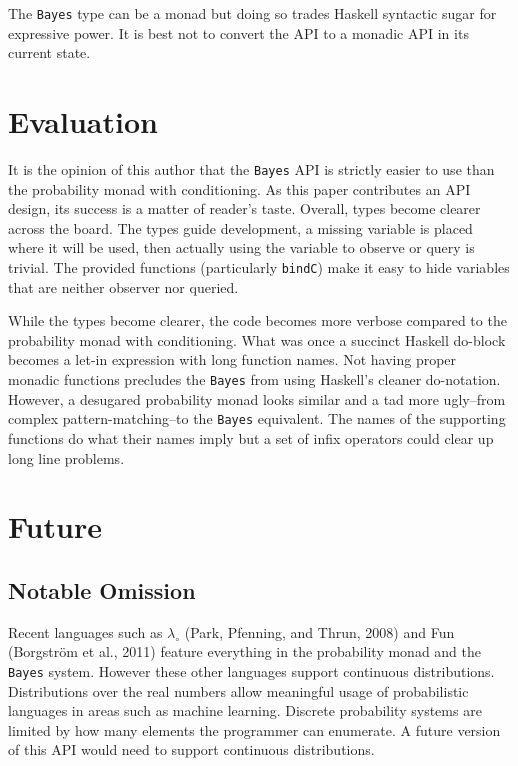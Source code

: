 \documentclass[10pt,twocolumn]{article}
\begin{document}
The \texttt{Bayes} type can be a monad but doing so trades Haskell syntactic sugar for expressive power. It is best not to convert the API to a monadic API in its current state.

\section{Evaluation}
It is the opinion of this author that the \texttt{Bayes} API is strictly easier to use than the probability monad with conditioning. As this paper contributes an API design, its success is a matter of reader's taste. Overall, types become clearer across the board. The types guide development, a missing variable is placed where it will be used, then actually using the variable to observe or query is trivial. The provided functions (particularly \texttt{bindC}) make it easy to hide variables that are neither observer nor queried.

While the types become clearer, the code becomes more verbose compared to the probability monad with conditioning. What was once a succinct Haskell do-block becomes a let-in expression with long function names. Not having proper monadic functions precludes the \texttt{Bayes} from using Haskell's cleaner do-notation. However, a desugared probability monad looks similar and a tad more ugly--from complex pattern-matching--to the \texttt{Bayes} equivalent. The names of the supporting functions do what their names imply but a set of infix operators could clear up long line problems.

\section{Future}
\subsection{Notable Omission}
Recent languages such as $\lambda_\circ$ (Park, Pfenning, and Thrun, 2008) and Fun (Borgström et al., 2011) feature everything in the probability monad and the \texttt{Bayes} system. However these other languages support continuous distributions. Distributions over the real numbers allow meaningful usage of probabilistic languages in areas such as machine learning. Discrete probability systems are limited by how many elements the programmer can enumerate. A future version of this API would need to support continuous distributions.
\end{document}
